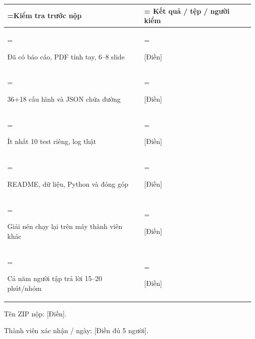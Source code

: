 \documentclass[11pt,a4paper]{article}
\begin{document}
\par\begingroup\footnotesize\renewcommand{\arraystretch}{1.5}
\begin{tabularx}{\linewidth}{>{\hsize=1.0465\hsize\linewidth=\hsize}X>{\hsize=0.9535\hsize\linewidth=\hsize}X}\toprule
\textbf{Kiểm tra trước nộp} & \textbf{Kết quả / tệp / người kiểm}\\\midrule
\strut Đã có báo cáo, PDF tính tay, 6–8 slide & \strut [Điền]\\
\strut 36+18 cấu hình và JSON chứa đường & \strut [Điền]\\
\strut Ít nhất 10 test riêng, log thật & \strut [Điền]\\
\strut README, dữ liệu, Python và đóng góp & \strut [Điền]\\
\strut Giải nén chạy lại trên máy thành viên khác & \strut [Điền]\\
\strut Cả năm người tập trả lời 15–20 phút/nhóm & \strut [Điền]\\
\bottomrule\end{tabularx}\endgroup\par\medskip
Tên ZIP nộp: [Điền].\par Thành viên xác nhận / ngày: [Điền đủ 5 người].\par\medskip
\end{document}
